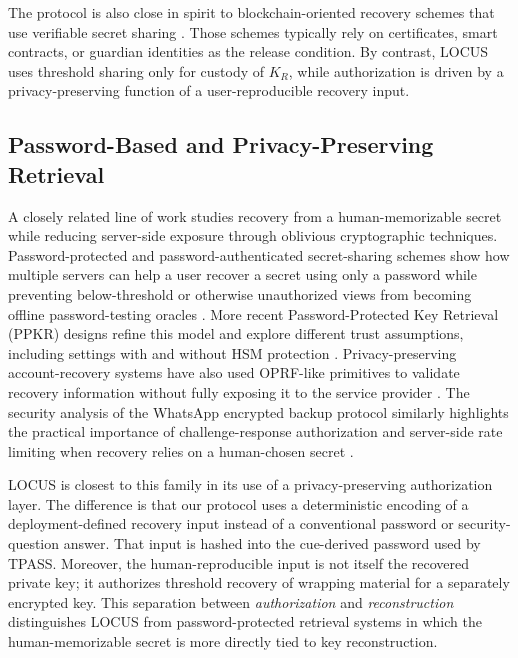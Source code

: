 The protocol is also close in spirit to blockchain-oriented recovery schemes that use verifiable secret sharing \cite{ConsortiumBlockchain2021,SocialWallet2023}. Those schemes typically rely on certificates, smart contracts, or guardian identities as the release condition. By contrast, \textsf{LOCUS} uses threshold sharing only for custody of \(K_R\), while authorization is driven by a privacy-preserving function of a user-reproducible recovery input.

\subsection{Password-Based and Privacy-Preserving Retrieval}

A closely related line of work studies recovery from a human-memorizable secret while reducing server-side exposure through oblivious cryptographic techniques. Password-protected and password-authenticated secret-sharing schemes show how multiple servers can help a user recover a secret using only a password while preventing below-threshold or otherwise unauthorized views from becoming offline password-testing oracles \cite{Bagherzandi2011PPSS,Jarecki2014PPSS,PPSS2016,Camenisch2014Memento,Camenisch2015TPASS,Yi2015TPASS,Yi2019TPASS}. More recent Password-Protected Key Retrieval (PPKR) designs refine this model and explore different trust assumptions, including settings with and without HSM protection \cite{PPKR2024}. Privacy-preserving account-recovery systems have also used OPRF-like primitives to validate recovery information without fully exposing it to the service provider \cite{SecureAccountRecovery2024}. The security analysis of the WhatsApp encrypted backup protocol similarly highlights the practical importance of challenge-response authorization and server-side rate limiting when recovery relies on a human-chosen secret \cite{WhatsAppBackup2023}.

\textsf{LOCUS} is closest to this family in its use of a privacy-preserving authorization layer. The difference is that our protocol uses a deterministic encoding of a deployment-defined recovery input instead of a conventional password or security-question answer. That input is hashed into the cue-derived password used by TPASS. Moreover, the human-reproducible input is not itself the recovered private key; it authorizes threshold recovery of wrapping material for a separately encrypted key. This separation between \emph{authorization} and \emph{reconstruction} distinguishes \textsf{LOCUS} from password-protected retrieval systems in which the human-memorizable secret is more directly tied to key reconstruction.

